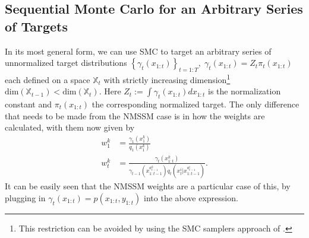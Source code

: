 \subsection{Sequential Monte Carlo for an Arbitrary Series of Targets}
\label{sec:part:smc:arb}

In its most general form, we can use SMC to target an arbitrary
series of unnormalized target distributions $\left\{\gamma_t (x_{1:t})\right\}_{t=1:T}, \; 
\gamma_t (x_{1:t}) = Z_t \pi_t (x_{1:t})$ each defined on a space
$\mathbb{X}_t$ with strictly increasing dimension\footnote{This restriction
	can be avoided by using the SMC samplers approach of \citet{del2006sequential}.}
$\mathrm{dim}(\mathbb{X}_{t-1})<\mathrm{dim}(\mathbb{X}_{t})$.
Here $Z_t := \int \gamma_t(x_{1:t}) dx_{1:t}$ is the normalization constant and $\pi_t (x_{1:t})$
the corresponding normalized target.  
The only difference that needs to be made from the NMSSM case is in how the weights
are calculated, with them now given by
\begin{subequations}
\label{eq:part:smc-arb-weights}
\begin{align}
w_1^k &= \frac{\gamma_1(x_1^k)}{q_1(x_1^k)} \\
w_t^k &= \frac{\gamma_t({x}_{1:t}^k)}{\gamma_{t - 1}({x}_{1:t - 1}^{a_{t - 1}^k}) q_t(x_t^i|x_{1:t-1}^{a_{t-1}^i})}.
\end{align}
\end{subequations}
It can be easily seen that the NMSSM weights are a particular case of this, by
plugging in $\gamma_t(x_{1:t}) = p(x_{1:t},y_{1:t})$ into the above expression.  

